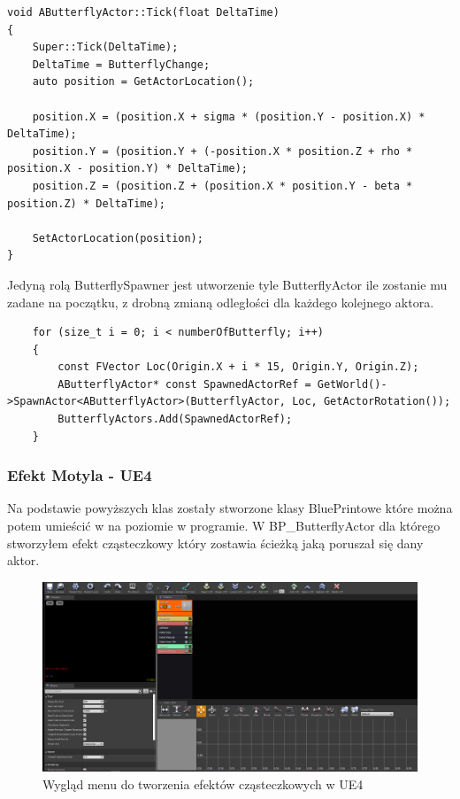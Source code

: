 \documentclass[a4paper,12pt,reqno]{article}
\begin{document}
\begin{lstlisting}
void AButterflyActor::Tick(float DeltaTime)
{
	Super::Tick(DeltaTime);
	DeltaTime = ButterflyChange;
	auto position = GetActorLocation();

	position.X = (position.X + sigma * (position.Y - position.X) * DeltaTime);
	position.Y = (position.Y + (-position.X * position.Z + rho * position.X - position.Y) * DeltaTime);
	position.Z = (position.Z + (position.X * position.Y - beta * position.Z) * DeltaTime);

	SetActorLocation(position);
}
\end{lstlisting}

Jedyną rolą ButterflySpawner jest utworzenie tyle ButterflyActor ile zostanie mu zadane na początku, z drobną zmianą odległości dla każdego kolejnego aktora.


\begin{lstlisting}
	for (size_t i = 0; i < numberOfButterfly; i++)
	{
		const FVector Loc(Origin.X + i * 15, Origin.Y, Origin.Z);
		AButterflyActor* const SpawnedActorRef = GetWorld()->SpawnActor<AButterflyActor>(ButterflyActor, Loc, GetActorRotation());
		ButterflyActors.Add(SpawnedActorRef);
	}
\end{lstlisting}

\subsubsection{Efekt Motyla - UE4}

Na podstawie powyższych klas zostały stworzone klasy BluePrintowe które można potem umieścić w na poziomie w programie. W BP\_ButterflyActor dla którego stworzyłem efekt cząsteczkowy który zostawia ścieżką jaką poruszał się dany aktor.

\begin{figure}[H]%
\centering
\includegraphics[width=0.7\columnwidth]{graphics/ButterflyParticleSystem.png}
\caption{Wygląd menu do tworzenia efektów cząsteczkowych w UE4 
\label{BPExample}}%
%
\qquad
\end{figure} 
\end{document}
